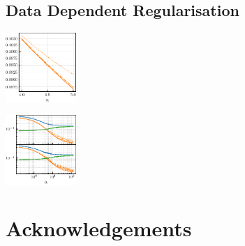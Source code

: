 \documentclass[a0paper,fleqn]{betterportraitposter}
\theoremstyle{plain}
\theoremstyle{definition}
\theoremstyle{remark}
\begin{document}
{\begin{multicols}{3}
\subsection{Data Dependent Regularisation}

\includegraphics[width=0.2\textwidth]{Assets/gen_lambda_optimal_sweep_alpha.pdf}


\includegraphics[width=0.2\textwidth]{Assets/effective_regularisation.pdf}

\section{Acknowledgements}



\columnbreak



\end{multicols}

}



\end{document}
